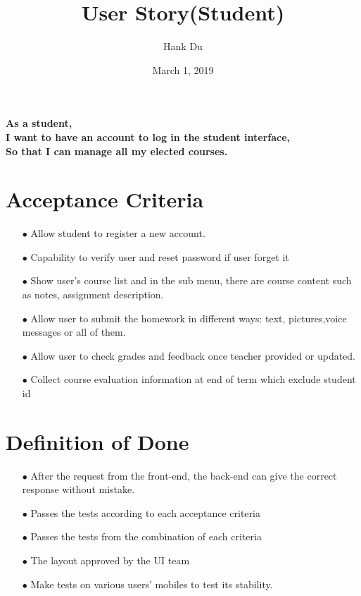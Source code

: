 \documentclass{article}
\begin{document}
\title{User Story(Student)}
\author{Hank Du}
\date{March 1, 2019}
\maketitle
\paragraph{\large As a student, \\
I want to have an account to log in the student interface,\\
So that I can manage all my elected courses.}

\section*{Acceptance Criteria}
\begin{itemize}
\item[$\bullet$] Allow student to register a new account.
\item[$\bullet$] Capability to verify user and reset password if user forget it
\item[$\bullet$] Show user's course list and in the sub menu, there are course content such as notes, assignment description. 
\item[$\bullet$] Allow user to submit the homework in different ways: text, pictures,voice messages or all of them.
\item[$\bullet$] Allow user to check grades and feedback once teacher provided or updated.
\item[$\bullet$] Collect course evaluation information at end of term which exclude student id 
\end{itemize}

\section*{Definition of Done}
\begin{itemize}
\item[$\bullet$] After the request from the front-end, the back-end can give the correct response without mistake.
\item[$\bullet$] Passes the tests according to each acceptance criteria
\item[$\bullet$] Passes the tests from the combination of each criteria
\item[$\bullet$] The layout approved by the UI team
\item[$\bullet$] Make tests on various users' mobiles to test its stability.
\end{itemize}
\end{document}
